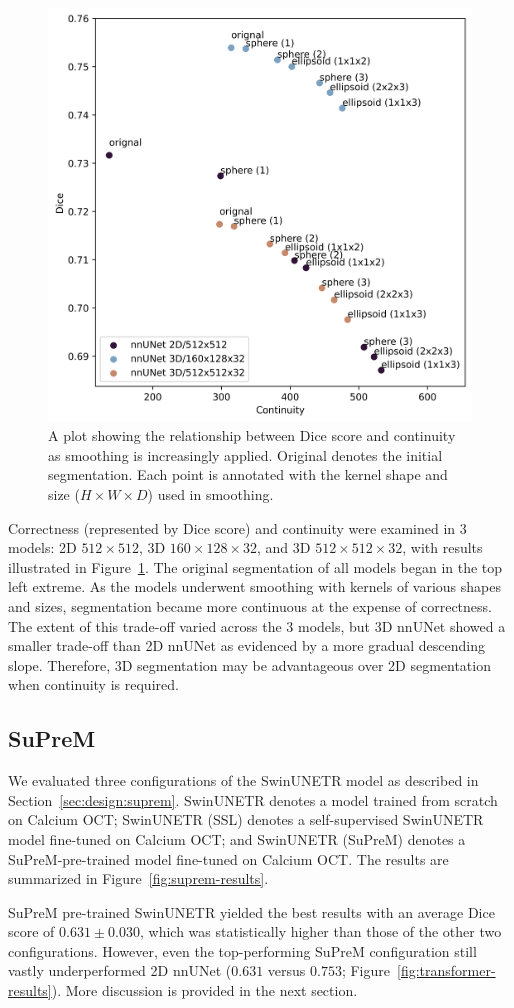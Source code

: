 \documentclass[a4paper,11pt,oneside]{report}
\begin{document}
\begin{figure}[htb]
    \centering
    \includegraphics[width=0.5\linewidth]{figures/result_nnunet_dice_and_continuity.png}
    \caption{A plot showing the relationship between Dice score and continuity as smoothing is increasingly applied. Original denotes the initial segmentation. Each point is annotated with the kernel shape and size ($H\times W\times D$) used in smoothing.}
    \label{fig:nnunet-continuity-vs-correctness}
\end{figure}

Correctness (represented by Dice score) and continuity were examined in 3 models: 2D $512\times 512$, 3D $160\times 128\times 32$, and 3D $512\times 512\times 32$, with results illustrated in Figure~\ref{fig:nnunet-continuity-vs-correctness}. The original segmentation of all models began in the top left extreme. As the models underwent smoothing with kernels of various shapes and sizes, segmentation became more continuous at the expense of correctness. The extent of this trade-off varied across the 3 models, but 3D nnUNet showed a smaller trade-off than 2D nnUNet as evidenced by a more gradual descending slope. Therefore, 3D segmentation may be advantageous over 2D segmentation when continuity is required.

\subsection{SuPreM}
We evaluated three configurations of the SwinUNETR model as described in Section~\ref{sec:design:suprem}. SwinUNETR denotes a model trained from scratch on Calcium OCT; SwinUNETR (SSL) denotes a self-supervised SwinUNETR model fine-tuned on Calcium OCT; and SwinUNETR (SuPreM) denotes a SuPreM-pre-trained model fine-tuned on Calcium OCT. The results are summarized in Figure~\ref{fig:suprem-results}. 

SuPreM pre-trained SwinUNETR yielded the best results with an average Dice score of $0.631\pm0.030$, which was statistically higher than those of the other two configurations. However, even the top-performing SuPreM configuration still vastly underperformed 2D nnUNet ($0.631$ versus $0.753$; Figure~\ref{fig:transformer-results}). More discussion is provided in the next section. %
\end{document}
